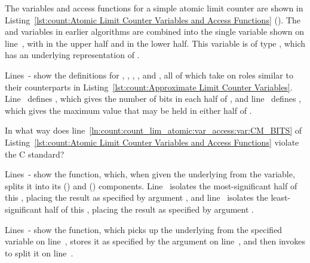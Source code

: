 \begin{lineref}
The variables and access functions for a simple atomic limit counter
are shown in
Listing~\ref{lst:count:Atomic Limit Counter Variables and Access Functions}
().
The  and  variables in earlier algorithms
are combined into the single variable  shown on
line~, with  in the upper half and  in
the lower half.
This variable is of type , which has an underlying
representation of .

Lines~- show the definitions for , ,
, , and , all of which
take on roles similar to their counterparts in
Listing~\ref{lst:count:Approximate Limit Counter Variables}.
Line~ defines , which gives the number of bits in each half
of , and line~ defines , which
gives the maximum value that may be held in either half of
.
\end{lineref}

\QuickQuiz{}
	In what way does
        line~\ref{ln:count:count_lim_atomic:var_access:var:CM_BITS} of
	Listing~\ref{lst:count:Atomic Limit Counter Variables and Access Functions}
	violate the C standard?
 \QuickQuizEnd

\begin{lineref}
Lines~- show the 
function, which,
when given the underlying  from the
 variable, splits it into its
 ()
and  () components.
Line~ isolates the most-significant half of this ,
placing the result as specified by argument ,
and line~ isolates the least-significant half of this ,
placing the result as specified by argument .
\end{lineref}

\begin{lineref}
Lines~- show the  function, which
picks up the underlying  from the specified variable
on line~, stores it as specified by the  argument on
line~, and then invokes  to split
it on line~.
\end{lineref}

